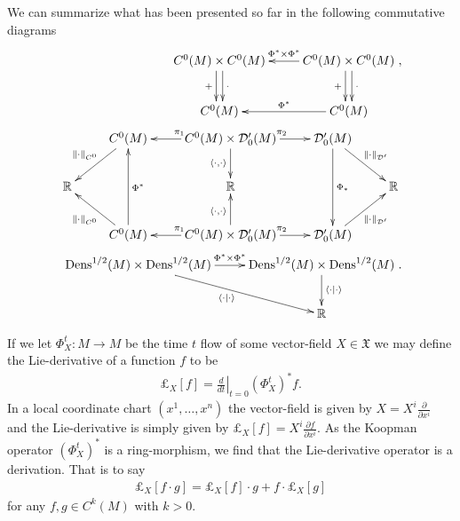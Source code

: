 \documentclass[12pt]{amsart}
\newcommand{\pder}[2]{\ensuremath{\frac{ \partial #1}{\partial #2}}}
\DeclareMathOperator{\Dens}{Dens}
\begin{document}
We can summarize what has been presented so far in the following commutative diagrams
\begin{align*}
	\xymatrix{
		C^0(M) \times C^0(M)  \ar@<-0.6ex>[d]_{+} \ar@<0.6ex>[d]^{\cdot} & \ar[l]_{\Phi^* \times \Phi^*} C^0(M) \times C^0(M)  \ar@<-0.6ex>[d]_{+} \ar@<0.6ex>[d]^{\cdot} \\
		C^0(M)  & \ar[l]_{\Phi^*} C^0(M)
	}, \\
	\xymatrix{
		& \ar[dl]_{\| \cdot \|_{C^0}} C^0(M) & \ar[l]_{\pi_1} C^0(M)\times \mathcal{D}'_0(M) \ar[d]_{\langle \cdot , \cdot \rangle} \ar[r]^{\pi_2} & \mathcal{D}'_0(M)   \ar[dd]^{\Phi_*} \ar[dr]^{\| \cdot \|_{\mathcal{D}'}}& \\
		\mathbb{R} && \mathbb{R} && \mathbb{R} \\
		& \ar[ul]^{\| \cdot \|_{C^0}} C^0(M) \ar[uu]_{\Phi^*} & \ar[l]_{\pi_1} C^0(M)\times \mathcal{D}'_0(M) \ar[u]^{\langle \cdot , \cdot \rangle} \ar[r]^{\pi_2} & \mathcal{D}'_0(M) \ar[ur]_{\| \cdot \|_{\mathcal{D}'}} &	
	} \\
	\xymatrix{
		\Dens^{1/2}(M) \times \Dens^{1/2}(M) \ar[dr]_{\langle \cdot \mid \cdot \rangle} \ar[r]^{\Phi^* \times \Phi^*} & \Dens^{1/2}(M) \times \Dens^{1/2}(M) \ar[d]^{\langle \cdot \mid \cdot \rangle} \\
		&\mathbb{R}
	}	.
\end{align*}



If we let $\Phi^t_X: M \to M$ be the time $t $ flow of some vector-field $X \in \mathfrak{X}$
we may define the Lie-derivative of a function $f$ to be
\begin{align*}
	\pounds_X[f] = \left. \frac{d}{d t} \right|_{t=0} (\Phi_X^t)^*f.
\end{align*}
In a local coordinate chart $(x^1,\dots,x^n)$ the vector-field is given by $X = X^i \pder{}{x^i}$
and the Lie-derivative is simply given by $\pounds_{X}[f] = X^i \pder{f}{x^i}$.
As the Koopman operator $(\Phi_X^t)^*$ is a ring-morphism, we find that the Lie-derivative operator is a derivation.
That is to say
\begin{align*}
	\pounds_X[ f \cdot g] = \pounds_X[f] \cdot g + f \cdot \pounds_X[g]
\end{align*}
for any $f,g \in C^k(M)$ with $k > 0$.


\end{document}
